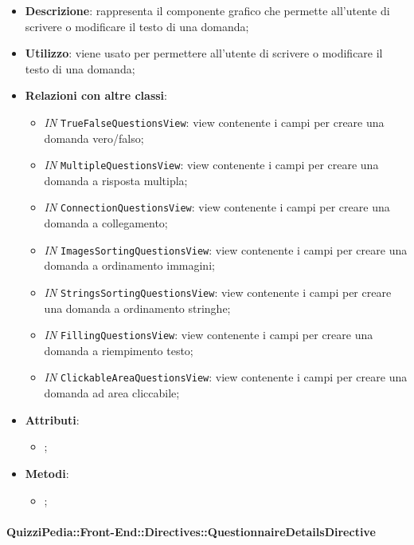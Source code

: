 \begin{itemize}
	\item \textbf{Descrizione}: rappresenta il componente grafico che permette all'utente di scrivere o modificare il testo di una domanda;
	\item \textbf{Utilizzo}: viene usato per permettere all'utente di scrivere o modificare il testo di una domanda;
	\item \textbf{Relazioni con altre classi}: 
	\begin{itemize}
		\item \textit{IN} \texttt{TrueFalseQuestionsView}: view contenente i campi per creare una domanda vero/falso; 
		\item \textit{IN} \texttt{MultipleQuestionsView}: view contenente i campi per creare una domanda a risposta multipla;
		\item \textit{IN} \texttt{ConnectionQuestionsView}: view contenente i campi per creare una domanda a collegamento;
		\item \textit{IN} \texttt{ImagesSortingQuestionsView}: view contenente i campi per creare una domanda a ordinamento immagini;
		\item \textit{IN} \texttt{StringsSortingQuestionsView}: view contenente i campi per creare una domanda a ordinamento stringhe;
		\item \textit{IN} \texttt{FillingQuestionsView}: view contenente i campi per creare una domanda a riempimento testo;
		\item \textit{IN} \texttt{ClickableAreaQuestionsView}: view contenente i campi per creare una domanda ad area cliccabile;
	\end{itemize}
	\item \textbf{Attributi}: 
	\begin{itemize}
		\item ;
	\end{itemize}
	\item \textbf{Metodi}: 
	\begin{itemize}
		\item ;
	\end{itemize}
\end{itemize}

\paragraph{QuizziPedia::Front-End::Directives::QuestionnaireDetailsDirective}

\label{QuizziPedia::Front-End::Directives::QuestionnaireDetailsDirective}

